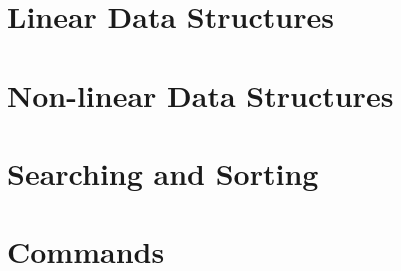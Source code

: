 \documentclass[twoside, 12pt, a4paper, english, openany]{book}
\begin{document}
\part{Linear Data Structures}





\part{Non-linear Data Structures}


\part{Searching and Sorting}




\part{Commands}

\end{document}
